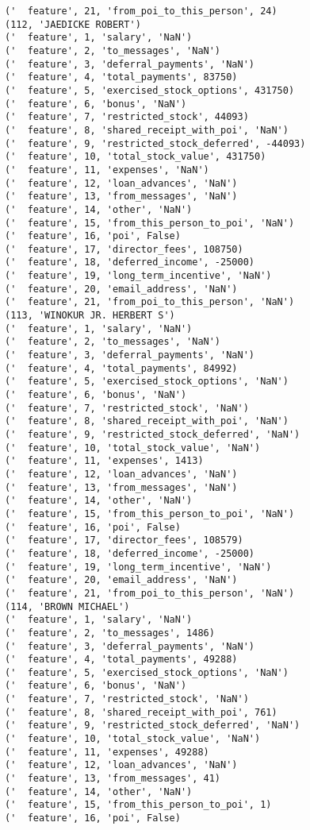 \begin{verbatim}
('  feature', 21, 'from_poi_to_this_person', 24)
(112, 'JAEDICKE ROBERT')
('  feature', 1, 'salary', 'NaN')
('  feature', 2, 'to_messages', 'NaN')
('  feature', 3, 'deferral_payments', 'NaN')
('  feature', 4, 'total_payments', 83750)
('  feature', 5, 'exercised_stock_options', 431750)
('  feature', 6, 'bonus', 'NaN')
('  feature', 7, 'restricted_stock', 44093)
('  feature', 8, 'shared_receipt_with_poi', 'NaN')
('  feature', 9, 'restricted_stock_deferred', -44093)
('  feature', 10, 'total_stock_value', 431750)
('  feature', 11, 'expenses', 'NaN')
('  feature', 12, 'loan_advances', 'NaN')
('  feature', 13, 'from_messages', 'NaN')
('  feature', 14, 'other', 'NaN')
('  feature', 15, 'from_this_person_to_poi', 'NaN')
('  feature', 16, 'poi', False)
('  feature', 17, 'director_fees', 108750)
('  feature', 18, 'deferred_income', -25000)
('  feature', 19, 'long_term_incentive', 'NaN')
('  feature', 20, 'email_address', 'NaN')
('  feature', 21, 'from_poi_to_this_person', 'NaN')
(113, 'WINOKUR JR. HERBERT S')
('  feature', 1, 'salary', 'NaN')
('  feature', 2, 'to_messages', 'NaN')
('  feature', 3, 'deferral_payments', 'NaN')
('  feature', 4, 'total_payments', 84992)
('  feature', 5, 'exercised_stock_options', 'NaN')
('  feature', 6, 'bonus', 'NaN')
('  feature', 7, 'restricted_stock', 'NaN')
('  feature', 8, 'shared_receipt_with_poi', 'NaN')
('  feature', 9, 'restricted_stock_deferred', 'NaN')
('  feature', 10, 'total_stock_value', 'NaN')
('  feature', 11, 'expenses', 1413)
('  feature', 12, 'loan_advances', 'NaN')
('  feature', 13, 'from_messages', 'NaN')
('  feature', 14, 'other', 'NaN')
('  feature', 15, 'from_this_person_to_poi', 'NaN')
('  feature', 16, 'poi', False)
('  feature', 17, 'director_fees', 108579)
('  feature', 18, 'deferred_income', -25000)
('  feature', 19, 'long_term_incentive', 'NaN')
('  feature', 20, 'email_address', 'NaN')
('  feature', 21, 'from_poi_to_this_person', 'NaN')
(114, 'BROWN MICHAEL')
('  feature', 1, 'salary', 'NaN')
('  feature', 2, 'to_messages', 1486)
('  feature', 3, 'deferral_payments', 'NaN')
('  feature', 4, 'total_payments', 49288)
('  feature', 5, 'exercised_stock_options', 'NaN')
('  feature', 6, 'bonus', 'NaN')
('  feature', 7, 'restricted_stock', 'NaN')
('  feature', 8, 'shared_receipt_with_poi', 761)
('  feature', 9, 'restricted_stock_deferred', 'NaN')
('  feature', 10, 'total_stock_value', 'NaN')
('  feature', 11, 'expenses', 49288)
('  feature', 12, 'loan_advances', 'NaN')
('  feature', 13, 'from_messages', 41)
('  feature', 14, 'other', 'NaN')
('  feature', 15, 'from_this_person_to_poi', 1)
('  feature', 16, 'poi', False)

\end{verbatim}
